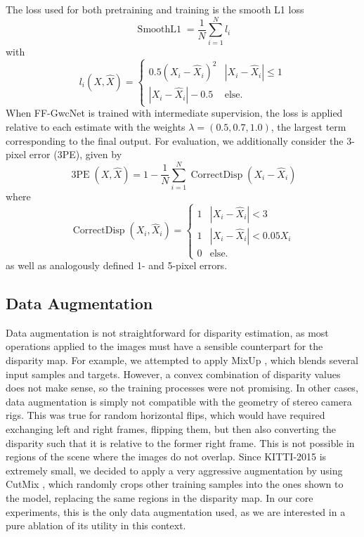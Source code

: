 \documentclass[runningheads]{llncs}
\begin{document}
The loss used for both pretraining and training is the smooth L1 loss
\begin{equation}
    \operatorname{SmoothL1} = \frac{1}{N} \sum_{i=1}^N l_i
\end{equation}
with
\begin{equation}
    l_i(X ,\hat{X}) = \begin{cases}
0.5(X_i - \hat{X}_i)^2 &|X_i - \hat{X}_i| \leq 1\\
|X_i - \hat{X}_i|-0.5 &\text{else}.
\end{cases}
\end{equation}
When FF-GwcNet is trained with intermediate supervision, the loss is applied relative to each estimate with the weights $\lambda = (0.5, 0.7, 1.0)$, the largest term corresponding to the final output. For evaluation, we additionally consider the 3-pixel error (3PE), given by
\begin{equation}
    \operatorname{3PE}(X ,\hat{X}) = 1 - \frac{1}{N} \sum_{i=1}^N \operatorname{CorrectDisp}(X_i - \hat{X}_i)
\end{equation}
where 
\begin{equation}
    \operatorname{CorrectDisp}(X_i, \hat{X}_i) = \begin{cases}
1 &|X_i - \hat{X}_i| < 3\\
1 &|X_i - \hat{X}_i| < 0.05 X_i\\
0 &\text{else}.
\end{cases}
\end{equation}
as well as analogously defined 1- and 5-pixel errors.

\subsection{Data Augmentation}
Data augmentation is not straightforward for disparity estimation, as most operations applied to the images must have a sensible counterpart for the disparity map. For example, we attempted to apply MixUp \cite{MixUp}, which blends several input samples and targets. However, a convex combination of disparity values does not make sense, so the training processes were not promising. In other cases, data augmentation is simply not compatible with the geometry of stereo camera rigs. This was true for random horizontal flips, which would have required exchanging left and right frames, flipping them, but then also converting the disparity such that it is relative to the former right frame. This is not possible in regions of the scene where the images do not overlap. Since KITTI-2015 is extremely small, we decided to apply a very aggressive augmentation by using CutMix \cite{CutMix}, which randomly crops other training samples into the ones shown to the model, replacing the same regions in the disparity map. In our core experiments, this is the only data augmentation used, as we are interested in a pure ablation of its utility in this context.
\end{document}
